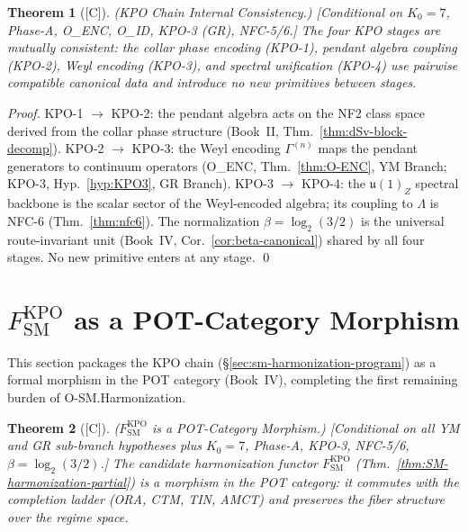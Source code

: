 \documentclass[12pt,oneside]{amsbook}
\theoremstyle{plain}
\newtheorem{theorem}{Theorem}[section]
\theoremstyle{definition}
\theoremstyle{remark}
\newcommand{\status}[1]{\textup{[#1]}}
\begin{document}
\begin{theorem}[\status{C}]\label{thm:SM-KPO-consistency}
\textup{(KPO Chain Internal Consistency.)}
\textup{[Conditional on $K_0=7$, Phase-A, O\_ENC, O\_ID,
KPO-3 (GR), NFC-5/6.]}
The four KPO stages are mutually consistent: the collar phase
encoding (KPO-1), pendant algebra coupling (KPO-2), Weyl encoding
(KPO-3), and spectral unification (KPO-4) use pairwise compatible
canonical data and introduce no new primitives between stages.
\end{theorem}

\begin{proof}
KPO-1 $\to$ KPO-2: the pendant algebra acts on the NF2 class
space derived from the collar phase structure (Book~II,
Thm.~\ref{thm:dSv-block-decomp}). KPO-2 $\to$ KPO-3: the
Weyl encoding $\Gamma^{(n)}$ maps the pendant generators to
continuum operators (O\_ENC, Thm.~\ref{thm:O-ENC}, YM Branch;
KPO-3, Hyp.~\ref{hyp:KPO3}, GR Branch). KPO-3 $\to$ KPO-4:
the $\mathfrak{u}(1)_Z$ spectral backbone is the scalar sector
of the Weyl-encoded algebra; its coupling to $\Lambda$ is
NFC-6 (Thm.~\ref{thm:nfc6}). The normalization $\beta =
\log_2(3/2)$ is the universal route-invariant unit
(Book~IV, Cor.~\ref{cor:beta-canonical}) shared by all four
stages. No new primitive enters at any stage. \qed
\end{proof}

\section{$F_{\mathrm{SM}}^{\mathrm{KPO}}$ as a POT-Category Morphism}
\label{sec:sm-pot-morphism}

This section packages the KPO chain (§\ref{sec:sm-harmonization-program})
as a formal morphism in the POT category (Book~IV), completing the
first remaining burden of O-SM.Harmonization.

\begin{theorem}[\status{C}]\label{thm:F-SM-POT-morphism}
\textup{($F_{\mathrm{SM}}^{\mathrm{KPO}}$ is a POT-Category Morphism.)}
\textup{[Conditional on all YM and GR sub-branch hypotheses plus
$K_0=7$, Phase-A, KPO-3, NFC-5/6, $\beta = \log_2(3/2)$.]}
The candidate harmonization functor $F_{\mathrm{SM}}^{\mathrm{KPO}}$
(Thm.~\ref{thm:SM-harmonization-partial}) is a morphism in the POT
category: it commutes with the completion ladder (ORA, CTM, TIN, AMCT)
and preserves the fiber structure over the regime space.
\end{theorem}
\end{document}
